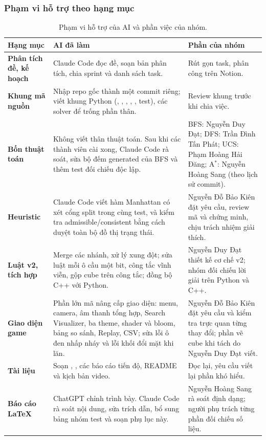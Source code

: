 \documentclass[a4paper]{article}
\newcommand{\tep}[1]{{\small\ttfamily\detokenize{#1}}}
\newcommand{\astar}{\texorpdfstring{A\ensuremath{^*}}{A*}}
\newcommand{\tvone}{Nguyễn Duy Đạt}
\newcommand{\tvtwo}{Trần Đình Tấn Phát}
\newcommand{\tvthree}{Phạm Hoàng Hải Đăng}
\newcommand{\tvfour}{Nguyễn Hoàng Sang}
\newcommand{\tvfive}{Nguyễn Đỗ Bảo Kiên}
\begin{document}
\subsubsection{Phạm vi hỗ trợ theo hạng mục}
\begin{table}[H]
\centering
\small
\renewcommand{\arraystretch}{1.3}
\setlength{\tabcolsep}{5pt}

\begin{tabularx}{\textwidth}{
    |>{\raggedright\arraybackslash\bfseries}p{2.4cm}
    |>{\raggedright\arraybackslash}X
    |>{\raggedright\arraybackslash}p{4.2cm}|
}
\hline
\rowcolor{blue!12}
Hạng mục & \textbf{AI đã làm} & \textbf{Phần của nhóm} \\
\hline
Phân tích đề, kế hoạch &
Claude Code đọc đề, soạn bản phân tích, chia sprint và danh sách task. &
Rút gọn task, phân công trên Notion. \\
\hline
Khung mã nguồn &
Nhập repo gốc thành một commit riêng; viết khung Python (\tep{Level}, \tep{State}, \tep{BloxorzProblem}, \tep{BaseSolver}, \tep{main.py}, test), các solver để trống phần thân. &
Review khung trước khi chia việc. \\
\hline
Bốn thuật toán &
Không viết thân thuật toán. Sau khi các thành viên cài xong, Claude Code rà soát, sửa bộ đếm generated của BFS và thêm test đối chiếu độc lập. &
BFS: \tvone; DFS: \tvtwo; UCS: \tvthree; \astar{}: \tvfour{} (theo lịch sử commit). \\
\hline
Heuristic &
Claude Code viết hàm Manhattan có xét cổng split trong \tep{heuristics.py} cùng test, và kiểm tra admissible/consistent bằng cách duyệt toàn bộ đồ thị trạng thái. &
\tvfive{} đặt yêu cầu, review mã và chứng minh, chịu trách nhiệm giải thích. \\
\hline
Luật v2, tích hợp &
Merge các nhánh, xử lý xung đột; sửa luật mỗi ô cầu một bit, công tắc vĩnh viễn, gộp cube trên công tắc; đồng bộ C++ với Python. &
\tvone{} thiết kế cơ chế v2; nhóm đối chiếu lời giải trên Python và C++. \\
\hline
Giao diện game &
Phần lớn mã nâng cấp giao diện: menu, camera, âm thanh tổng hợp, Search Visualizer, ba theme, shader và bloom, bảng so sánh, Replay, CSV; sửa lỗi ô đen nhấp nháy và lỗi khối đổi mặt khi lăn. &
\tvfive{} đặt yêu cầu và kiểm tra trực quan từng thay đổi; phần vẽ cube khi tách do \tvone{} viết. \\
\hline
Tài liệu &
Soạn \tep{system.md}, \tep{play.md}, các báo cáo tiến độ, README và kịch bản video. &
Đọc lại, yêu cầu viết lại phần khó hiểu. \\
\hline
Báo cáo LaTeX &
ChatGPT chỉnh trình bày. Claude Code rà soát nội dung, sửa trích dẫn, bổ sung bảng nhóm test và soạn phụ lục này. &
\tvfour{} rà soát định dạng; người phụ trách từng phần đối chiếu số liệu. \\
\hline
\end{tabularx}

\caption{Phạm vi hỗ trợ của AI và phần việc của nhóm.}
\label{tab:pham-vi-ai}
\end{table}
\end{document}
